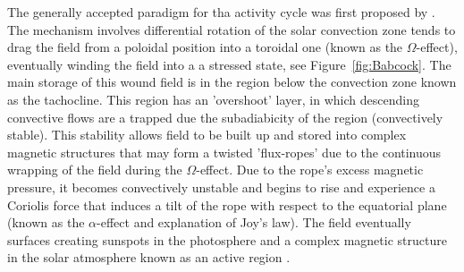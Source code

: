 

The generally accepted paradigm for tha activity cycle was first proposed by \citet{babcock1961}. The mechanism involves differential rotation of the solar convection zone tends to drag the field from a poloidal position into a toroidal one (known as the $\Omega$-effect), eventually winding the field into a a stressed state, see Figure~\ref{fig:Babcock}. The main storage of this wound field is in the region below the convection zone known as the tachocline. This region has an 'overshoot' layer, in which descending convective flows are a trapped due the subadiabicity of the region (convectively stable). This stability allows field to be built up and stored into complex magnetic structures that may form a twisted 'flux-ropes' due to the continuous wrapping of the field during the $\Omega$-effect. Due to the rope's excess magnetic pressure, it becomes convectively unstable and begins to rise and experience a Coriolis force that induces a tilt of the rope with respect to the equatorial plane (known as the $\alpha$-effect and explanation of Joy's law). The field eventually surfaces creating sunspots in the photosphere and a complex magnetic structure in the solar atmosphere known as an active region \citep{fan2009}.




